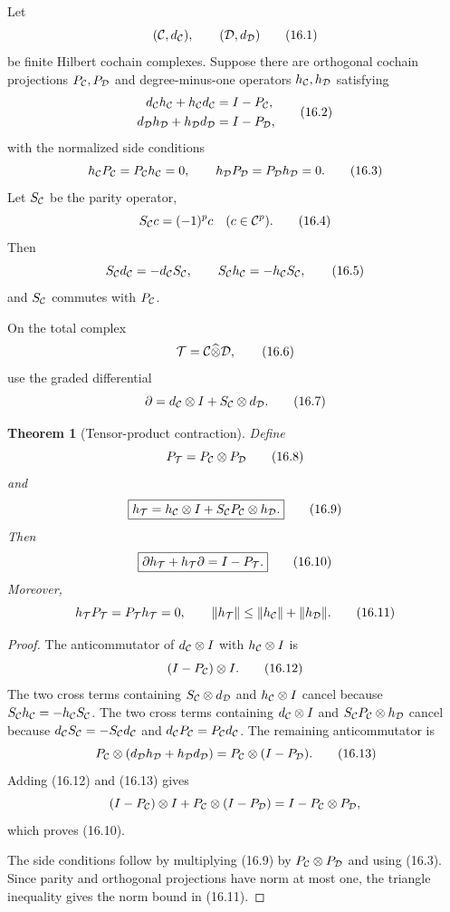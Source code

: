 \documentclass[11pt]{article}
\newtheorem{theorem}{Theorem}[section]
\theoremstyle{remark}
\begin{document}
Let
\[
 ({\cal C},d_{\cal C}),\qquad({\cal D},d_{\cal D})           \tag{16.1}
\]
be finite Hilbert cochain complexes.  Suppose there are orthogonal
cochain projections \(P_{\cal C},P_{\cal D}\) and degree-minus-one
operators \(h_{\cal C},h_{\cal D}\) satisfying
\[
\begin{split}
 d_{\cal C}h_{\cal C}+h_{\cal C}d_{\cal C}&=I-P_{\cal C},\\
 d_{\cal D}h_{\cal D}+h_{\cal D}d_{\cal D}&=I-P_{\cal D},
\end{split}                                                  \tag{16.2}
\]
with the normalized side conditions
\[
 h_{\cal C}P_{\cal C}=P_{\cal C}h_{\cal C}=0,\qquad
 h_{\cal D}P_{\cal D}=P_{\cal D}h_{\cal D}=0.               \tag{16.3}
\]
Let \(S_{\cal C}\) be the parity operator,
\[
                  S_{\cal C}c=(-1)^p c
 \quad(c\in{\cal C}^p).                                    \tag{16.4}
\]
Then
\[
 S_{\cal C}d_{\cal C}=-d_{\cal C}S_{\cal C},\qquad
 S_{\cal C}h_{\cal C}=-h_{\cal C}S_{\cal C},                \tag{16.5}
\]
and \(S_{\cal C}\) commutes with \(P_{\cal C}\).

On the total complex
\[
 {\cal T}={\cal C}\widehat\otimes{\cal D},                  \tag{16.6}
\]
use the graded differential
\[
 \partial=d_{\cal C}\otimes I+
          S_{\cal C}\otimes d_{\cal D}.                    \tag{16.7}
\]

\begin{theorem}[Tensor-product contraction]
\label{thm:v12v16-tensor}
Define
\[
 P_{\cal T}=P_{\cal C}\otimes P_{\cal D}                    \tag{16.8}
\]
and
\[
 \boxed{
 h_{\cal T}
 =
 h_{\cal C}\otimes I+
 S_{\cal C}P_{\cal C}\otimes h_{\cal D}.}                  \tag{16.9}
\]
Then
\[
 \boxed{
 \partial h_{\cal T}+h_{\cal T}\partial=I-P_{\cal T}.}      \tag{16.10}
\]
Moreover,
\[
 h_{\cal T}P_{\cal T}=P_{\cal T}h_{\cal T}=0,\qquad
 \|h_{\cal T}\|
 \le\|h_{\cal C}\|+\|h_{\cal D}\|.                         \tag{16.11}
\]
\end{theorem}

\begin{proof}
The anticommutator of
\(d_{\cal C}\otimes I\) with \(h_{\cal C}\otimes I\) is
\[
                    (I-P_{\cal C})\otimes I.                \tag{16.12}
\]
The two cross terms containing
\(S_{\cal C}\otimes d_{\cal D}\) and
\(h_{\cal C}\otimes I\) cancel because
\(S_{\cal C}h_{\cal C}=-h_{\cal C}S_{\cal C}\).
The two cross terms containing
\(d_{\cal C}\otimes I\) and
\(S_{\cal C}P_{\cal C}\otimes h_{\cal D}\) cancel because
\(d_{\cal C}S_{\cal C}=-S_{\cal C}d_{\cal C}\) and
\(d_{\cal C}P_{\cal C}=P_{\cal C}d_{\cal C}\).
The remaining anticommutator is
\[
 P_{\cal C}\otimes
 (d_{\cal D}h_{\cal D}+h_{\cal D}d_{\cal D})
 =
 P_{\cal C}\otimes(I-P_{\cal D}).                          \tag{16.13}
\]
Adding (16.12) and (16.13) gives
\[
 (I-P_{\cal C})\otimes I+
 P_{\cal C}\otimes(I-P_{\cal D})
 =I-P_{\cal C}\otimes P_{\cal D},
\]
which proves (16.10).

The side conditions follow by multiplying (16.9) by
\(P_{\cal C}\otimes P_{\cal D}\) and using (16.3).  Since parity and
orthogonal projections have norm at most one, the triangle
inequality gives the norm bound in (16.11).
\end{proof}
\end{document}
